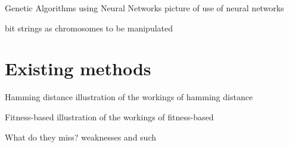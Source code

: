 \begin{frame}{Genetic Algorithms using Neural Networks}
  picture of use of neural networks

  bit strings as chromosomes to be manipulated
\end{frame}

\section{Existing methods}

\begin{frame}{Hamming distance}
  illustration of the workings of hamming distance
\end{frame}

\begin{frame}{Fitness-based}
  illustration of the workings of fitness-based
\end{frame}

\begin{frame}{What do they miss?}
  weaknesses and such
\end{frame}

